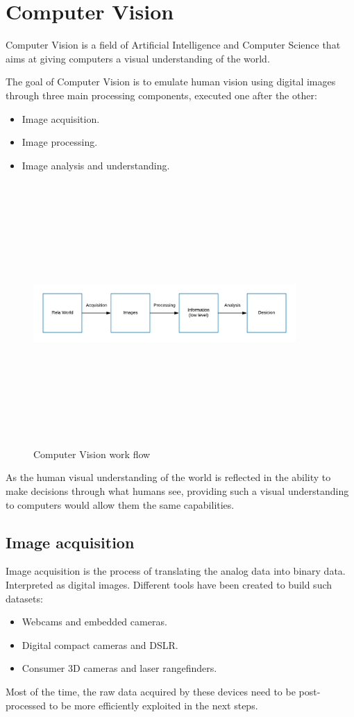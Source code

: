 \section{Computer Vision}
Computer Vision is a field of Artificial Intelligence and Computer Science that aims at giving computers a visual understanding of the world.

The goal of Computer Vision is to emulate human vision using digital images through three main processing components, executed one after the other:
\begin{itemize}
    \item Image acquisition.
    \item Image processing.
    \item Image analysis and understanding.
\end{itemize}
\begin{figure}[H]
\centering
\includegraphics[width=10cm,height=10cm,keepaspectratio]{imagenes/ComputerVisionBlocks.png}
\caption{Computer Vision work flow}
\label{fig:ComputerVision}
\end{figure}
As the human visual understanding of the world is reflected in the ability to make decisions through what humans see, providing such a visual understanding to computers would allow them the same capabilities.

\subsection{Image acquisition}
Image acquisition is the process of translating the analog data into binary data. Interpreted as digital images.
Different tools have been created to build such datasets:
\begin{itemize}
    \item Webcams and embedded cameras.
    \item Digital compact cameras and DSLR.
    \item Consumer 3D cameras and laser rangefinders.
\end{itemize}
Most of the time, the raw data acquired by these devices need to be post-processed to be more efficiently exploited in the next steps.

